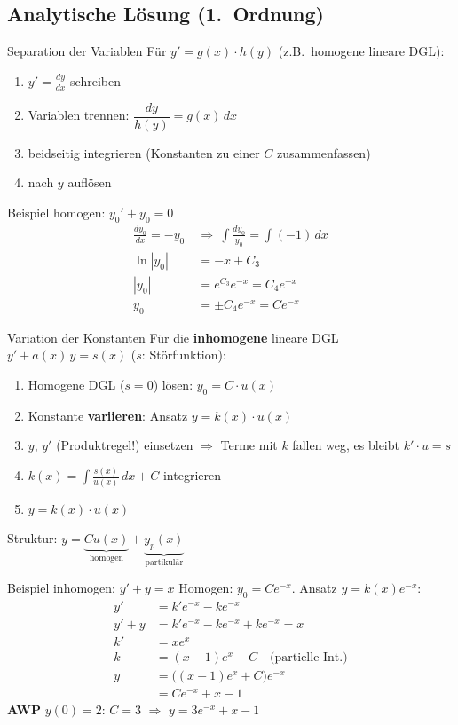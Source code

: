 \documentclass[a4paper, fontsize=7pt]{scrartcl}
\def\dx{\,dx}
\begin{document}
\subsection{Analytische Lösung (1.\ Ordnung)}

\begin{mainbox}{Separation der Variablen}
Für $y' = g(x) \cdot h(y)$ (z.B.\ homogene lineare DGL):
\begin{enumerate}
    \item $y' = \frac{dy}{dx}$ schreiben
    \item Variablen trennen: $\dfrac{dy}{h(y)} = g(x)\dx$
    \item beidseitig integrieren (Konstanten zu einer $C$ zusammenfassen)
    \item nach $y$ auflösen
\end{enumerate}
\end{mainbox}

\begin{subbox}{Beispiel homogen: $y_0' + y_0 = 0$}
\begin{align*}
\frac{dy_0}{dx} = -y_0 \ &\Rightarrow\ \int \frac{dy_0}{y_0}
= \int (-1)\dx\\
\ln|y_0| &= -x + C_3\\
|y_0| &= e^{C_3} e^{-x} = C_4 e^{-x}\\
y_0 &= \pm C_4 e^{-x} = Ce^{-x}
\end{align*}
\end{subbox}

\begin{mainbox}{Variation der Konstanten}
Für die \textbf{inhomogene} lineare DGL $y' + a(x)\,y = s(x)$
($s$: Störfunktion):
\begin{enumerate}
    \item Homogene DGL ($s = 0$) lösen: $y_0 = C \cdot u(x)$
    \item Konstante \textbf{variieren}: Ansatz $y = k(x) \cdot u(x)$
    \item $y$, $y'$ (Produktregel!) einsetzen $\Rightarrow$ Terme mit
          $k$ fallen weg, es bleibt $k' \cdot u = s$
    \item $k(x) = \int \frac{s(x)}{u(x)}\dx + C$ integrieren
    \item $y = k(x) \cdot u(x)$
\end{enumerate}
Struktur: $y = \underbrace{Cu(x)}_{\text{homogen}} +
\underbrace{y_p(x)}_{\text{partikulär}}$
\end{mainbox}

\begin{subbox}{Beispiel inhomogen: $y' + y = x$}
Homogen: $y_0 = Ce^{-x}$. Ansatz $y = k(x)e^{-x}$:
\begin{align*}
y' &= k'e^{-x} - ke^{-x}\\
y' + y &= k'e^{-x} - ke^{-x} + ke^{-x} = x\\
k' &= xe^{x}\\
k &= (x - 1)e^{x} + C \quad \text{(partielle Int.)}\\
y &= \big((x-1)e^x + C\big)e^{-x}\\
  &= Ce^{-x} + x - 1
\end{align*}
\textbf{AWP} $y(0) = 2$: $C = 3$ $\Rightarrow$ $y = 3e^{-x} + x - 1$
\end{subbox}
\end{document}
